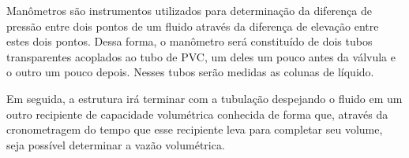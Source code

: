 Manômetros são instrumentos utilizados para determinação da diferença de 
pressão entre dois pontos de um fluido através
da diferença de elevação entre estes dois pontos. Dessa forma, o manômetro 
será constituído de dois tubos transparentes
acoplados ao tubo de PVC, um deles um pouco antes da válvula e o outro um 
pouco depois. Nesses tubos serão medidas as colunas de líquido. 

Em seguida, a estrutura irá terminar com a tubulação despejando o fluido em um 
outro recipiente de capacidade
volumétrica conhecida de forma que, através da cronometragem do tempo que esse 
recipiente leva para completar seu volume, seja possível 
determinar a vazão volumétrica. 

